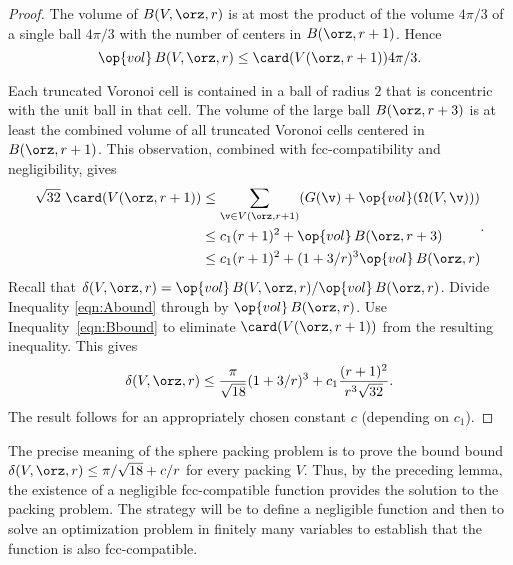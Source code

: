\begin{proof} 
The volume of $B( V,\orz,r)$ is at most the product of the volume
$4\pi/3$ of a single ball $4\pi/3$ with the number of centers in
$B(\orz,r+1)$.  Hence
\begin{equation} 
\op{vol}\, B( V,\orz,r) \le \card( V(\orz,r+1)) 4\pi/3.
\label{eqn:Abound}
\end{equation}

Each truncated Voronoi cell is contained in a ball of
radius $2$ that is concentric with the unit ball in that cell.  The volume
of the large ball $B(\orz,r+3)$ is at least the combined volume of 
all truncated Voronoi
cells centered in $B(\orz,r+1)$. This observation,
combined with fcc-compatibility and negligibility, gives
\begin{equation} 
\begin{split} 
\sqrt{32}\,\,\card( V(\orz,r+1))
&\le \sum_{\v\in V(\orz,r+1)} (G(\v) +
\op{vol}(\Omega(V,\v))) \\
&\le c_1 (r+1)^2 + \op{vol}\,B(\orz,r+3) \\
&\le c_1 (r+1)^2 + (1+3/r)^3 \op{vol}\,B(\orz,r)
\label{eqn:Bbound}
\end{split}.
\end{equation}
%
Recall that $\delta( V,\orz,r)=
\op{vol}\,B( V,\orz,r)/\op{vol}\,B(\orz,r)$. Divide Inequality
\ref{eqn:Abound} through by $\op{vol}\,B(\orz,r)$.  Use
Inequality~\ref{eqn:Bbound} to eliminate $\card( V(\orz,r+1))$ from the
resulting inequality.  This gives
\begin{displaymath}\delta( V,\orz,r)
\le \frac{\pi}{\sqrt{18}} (1+3/r)^3 + c_1 \frac{(r+1)^2}{r^3\sqrt{32}}.
\end{displaymath}
The result follows for an appropriately chosen constant $c$
(depending on $c_1$).
\end{proof}

\begin{remark}\label{remark:precise} The precise meaning of the
sphere packing problem is to prove the bound bound $\delta( V,\orz,r)
\le \pi/\sqrt{18} + c/r$ for every packing $ V$.  Thus, by the
preceding lemma, the existence of a negligible fcc-compatible
function provides the solution to the packing problem.  The strategy
will be to define a negligible function and then to solve an
optimization problem in finitely many variables to establish that
the function is also fcc-compatible.
\end{remark}


